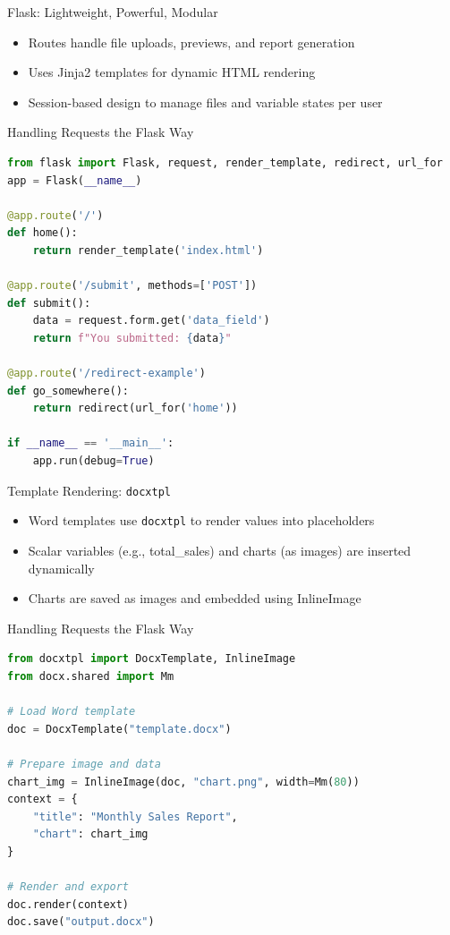 \documentclass[handout, 12pt]{beamer}
\begin{document}
	\begin{frame}{Flask: Lightweight, Powerful, Modular}
		\begin{itemize}
		  \item Routes handle file uploads, previews, and report generation
		  \item Uses Jinja2 templates for dynamic HTML rendering
		  \item Session-based design to manage files and variable states per user
		\end{itemize}
	\end{frame}
	
	\begin{frame}[fragile]{Handling Requests the Flask Way}
		\begin{lstlisting}[language=Python, breaklines=true, basicstyle=\fontsize{6.5pt}{7.8pt}\selectfont]
from flask import Flask, request, render_template, redirect, url_for
app = Flask(__name__)

@app.route('/')
def home():
    return render_template('index.html')

@app.route('/submit', methods=['POST'])
def submit():
    data = request.form.get('data_field')
    return f"You submitted: {data}"

@app.route('/redirect-example')
def go_somewhere():
    return redirect(url_for('home'))

if __name__ == '__main__':
    app.run(debug=True)
\end{lstlisting}
	\end{frame}

	\begin{frame}{Template Rendering: \texttt{docxtpl}}
		\begin{itemize}
		  \item Word templates use \texttt{docxtpl} to render values into placeholders
		  \item Scalar variables (e.g., total\_sales) and charts (as images) are inserted dynamically
		  \item Charts are saved as images and embedded using InlineImage
		\end{itemize}
	\end{frame}

	\begin{frame}[fragile]{Handling Requests the Flask Way}
		\begin{lstlisting}[language=Python, breaklines=true, basicstyle=\fontsize{6.5pt}{7.8pt}\selectfont]
from docxtpl import DocxTemplate, InlineImage
from docx.shared import Mm

# Load Word template
doc = DocxTemplate("template.docx")

# Prepare image and data
chart_img = InlineImage(doc, "chart.png", width=Mm(80))
context = {
    "title": "Monthly Sales Report",
    "chart": chart_img
}

# Render and export
doc.render(context)
doc.save("output.docx")
\end{lstlisting}
	\end{frame}
\end{document}
